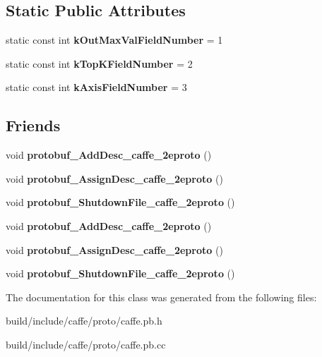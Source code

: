 \subsection*{Static Public Attributes}
\begin{DoxyCompactItemize}
\item 
\mbox{\label{classcaffe_1_1_arg_max_parameter_ae799fd769b7fd4b8a117d872ba1be3b2}} 
static const int {\bfseries k\+Out\+Max\+Val\+Field\+Number} = 1
\item 
\mbox{\label{classcaffe_1_1_arg_max_parameter_afb53ec50746673d69a755bfe052f8285}} 
static const int {\bfseries k\+Top\+K\+Field\+Number} = 2
\item 
\mbox{\label{classcaffe_1_1_arg_max_parameter_aa24d3709b1547788edc038f51c0d2257}} 
static const int {\bfseries k\+Axis\+Field\+Number} = 3
\end{DoxyCompactItemize}
\subsection*{Friends}
\begin{DoxyCompactItemize}
\item 
\mbox{\label{classcaffe_1_1_arg_max_parameter_a2670a9c8ffd0e5105cf7522cd6f8613d}} 
void {\bfseries protobuf\+\_\+\+Add\+Desc\+\_\+caffe\+\_\+2eproto} ()
\item 
\mbox{\label{classcaffe_1_1_arg_max_parameter_a7f145bddbdde78003d27e42c7e003d23}} 
void {\bfseries protobuf\+\_\+\+Assign\+Desc\+\_\+caffe\+\_\+2eproto} ()
\item 
\mbox{\label{classcaffe_1_1_arg_max_parameter_a026784a8e4e76f1b4daf9d033d2ece83}} 
void {\bfseries protobuf\+\_\+\+Shutdown\+File\+\_\+caffe\+\_\+2eproto} ()
\item 
\mbox{\label{classcaffe_1_1_arg_max_parameter_a2670a9c8ffd0e5105cf7522cd6f8613d}} 
void {\bfseries protobuf\+\_\+\+Add\+Desc\+\_\+caffe\+\_\+2eproto} ()
\item 
\mbox{\label{classcaffe_1_1_arg_max_parameter_a7f145bddbdde78003d27e42c7e003d23}} 
void {\bfseries protobuf\+\_\+\+Assign\+Desc\+\_\+caffe\+\_\+2eproto} ()
\item 
\mbox{\label{classcaffe_1_1_arg_max_parameter_a026784a8e4e76f1b4daf9d033d2ece83}} 
void {\bfseries protobuf\+\_\+\+Shutdown\+File\+\_\+caffe\+\_\+2eproto} ()
\end{DoxyCompactItemize}


The documentation for this class was generated from the following files\+:\begin{DoxyCompactItemize}
\item 
build/include/caffe/proto/caffe.\+pb.\+h\item 
build/include/caffe/proto/caffe.\+pb.\+cc\end{DoxyCompactItemize}

